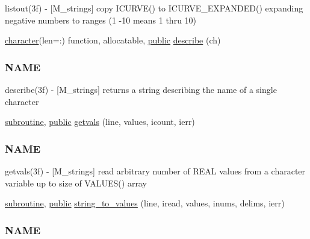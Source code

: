 \begin{DoxyCompactItemize}
\begin{DoxyCompactList}
listout(3f) -\/ \mbox{[}M\+\_\+strings\mbox{]} copy I\+C\+U\+R\+V\+E() to I\+C\+U\+R\+V\+E\+\_\+\+E\+X\+P\+A\+N\+D\+E\+D() expanding negative numbers to ranges (1 -\/10 means 1 thru 10) \end{DoxyCompactList}\item 
\hyperlink{option__stopwatch_83_8txt_abd4b21fbbd175834027b5224bfe97e66}{character}(len=\+:) function, allocatable, \hyperlink{M__stopwatch_83_8txt_a2f74811300c361e53b430611a7d1769f}{public} \hyperlink{namespacem__strings_a8d7007f0c34d7db4c004dac56e609b3f}{describe} (ch)
\begin{DoxyCompactList}\small\item\em \subsubsection*{N\+A\+ME}

describe(3f) -\/ \mbox{[}M\+\_\+strings\mbox{]} returns a string describing the name of a single character \end{DoxyCompactList}\item 
\hyperlink{M__stopwatch_83_8txt_acfbcff50169d691ff02d4a123ed70482}{subroutine}, \hyperlink{M__stopwatch_83_8txt_a2f74811300c361e53b430611a7d1769f}{public} \hyperlink{namespacem__strings_abf6c760f5d15a306bd252337d0a5ba4d}{getvals} (line, values, icount, ierr)
\begin{DoxyCompactList}\small\item\em \subsubsection*{N\+A\+ME}

getvals(3f) -\/ \mbox{[}M\+\_\+strings\mbox{]} read arbitrary number of R\+E\+AL values from a character variable up to size of V\+A\+L\+U\+E\+S() array \end{DoxyCompactList}\item 
\hyperlink{M__stopwatch_83_8txt_acfbcff50169d691ff02d4a123ed70482}{subroutine}, \hyperlink{M__stopwatch_83_8txt_a2f74811300c361e53b430611a7d1769f}{public} \hyperlink{namespacem__strings_af3767887ce5c2373a6d9061ea6664bfc}{string\+\_\+to\+\_\+values} (line, iread, values, inums, delims, ierr)
\begin{DoxyCompactList}\small\item\em \subsubsection*{N\+A\+ME}


\end{DoxyCompactList}
\end{DoxyCompactItemize}
